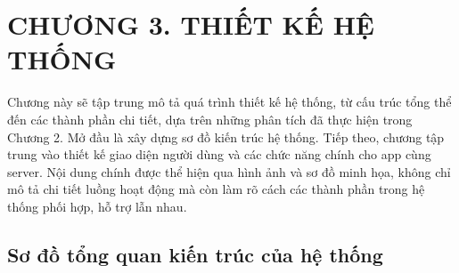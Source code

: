 
\section*{CHƯƠNG 3. THIẾT KẾ HỆ THỐNG}
\setcounter{section}{3}
\setcounter{subsection}{0} %
\setcounter{table}{0} %
\setcounter{figure}{0} %

Chương này sẽ tập trung mô tả quá trình thiết kế hệ thống, từ cấu trúc tổng thể đến các thành phần chi tiết, dựa trên những phân tích đã thực hiện trong Chương 2.
Mở đầu là xây dựng sơ đồ kiến trúc hệ thống.
Tiếp theo, chương tập trung vào thiết kế giao diện người dùng và các chức năng chính cho app cùng server.
Nội dung chính được thể hiện qua hình ảnh và sơ đồ minh họa, không chỉ mô tả chi tiết luồng hoạt động mà còn làm rõ cách các thành phần trong hệ thống phối hợp, hỗ trợ lẫn nhau.
\subsection{Sơ đồ tổng quan kiến trúc của hệ thống}

